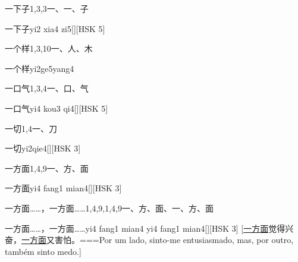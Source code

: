\begin{Entry}{一下子}{1,3,3}{⼀、⼀、⼦}
  \begin{Phonetics}{一下子}{yi2 xia4 zi5}[][HSK 5]
  \end{Phonetics}
\end{Entry}

\begin{Entry}{一个样}{1,3,10}{⼀、⼈、⽊}
  \begin{Phonetics}{一个样}{yi2ge5yang4}
  \end{Phonetics}
\end{Entry}

\begin{Entry}{一口气}{1,3,4}{⼀、⼝、⽓}
  \begin{Phonetics}{一口气}{yi4 kou3 qi4}[][HSK 5]
  \end{Phonetics}
\end{Entry}

\begin{Entry}{一切}{1,4}{⼀、⼑}
  \begin{Phonetics}{一切}{yi2qie4}[][HSK 3]
  \end{Phonetics}
\end{Entry}

\begin{Entry}{一方面}{1,4,9}{⼀、⽅、⾯}
  \begin{Phonetics}{一方面}{yi4 fang1 mian4}[][HSK 3]
  \end{Phonetics}
\end{Entry}

\begin{Entry}{一方面……，一方面……}{1,4,9,1,4,9}{⼀、⽅、⾯、⼀、⽅、⾯}
  \begin{Phonetics}{一方面……，一方面……}{yi4 fang1 mian4 yi4 fang1 mian4}[][HSK 3]
    [\underline{一方面}觉得兴奋，\underline{一方面}又害怕。===Por um lado, sinto-me entusiasmado, mas, por outro, também sinto medo.]
  \end{Phonetics}
\end{Entry}

